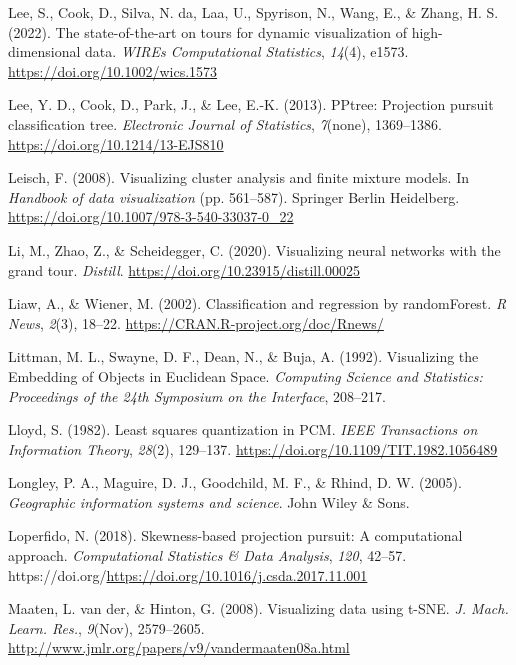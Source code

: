 \documentclass[
  letterpaper,
]{krantz}
\newlength{\cslhangindent}
\newenvironment{CSLReferences}[2] %
 {\begin{list}{}{%
  \setlength{\itemindent}{0pt}
  \setlength{\leftmargin}{0pt}
  \setlength{\parsep}{0pt}
  \ifodd #1
   \setlength{\leftmargin}{\cslhangindent}
   \setlength{\itemindent}{-1\cslhangindent}
  \fi
  \setlength{\itemsep}{#2\baselineskip}}}
 {\end{list}}
\begin{document}
\begin{CSLReferences}{1}{0}
Lee, S., Cook, D., Silva, N. da, Laa, U., Spyrison, N., Wang, E., \&
Zhang, H. S. (2022). The state-of-the-art on tours for dynamic
visualization of high-dimensional data. \emph{WIREs Computational
Statistics}, \emph{14}(4), e1573.
\url{https://doi.org/10.1002/wics.1573}

Lee, Y. D., Cook, D., Park, J., \& Lee, E.-K. (2013). {PPtree:
Projection pursuit classification tree}. \emph{Electronic Journal of
Statistics}, \emph{7}(none), 1369--1386.
\url{https://doi.org/10.1214/13-EJS810}

Leisch, F. (2008). Visualizing cluster analysis and finite mixture
models. In \emph{Handbook of data visualization} (pp. 561--587).
Springer Berlin Heidelberg.
\url{https://doi.org/10.1007/978-3-540-33037-0_22}

Li, M., Zhao, Z., \& Scheidegger, C. (2020). Visualizing neural networks
with the grand tour. \emph{Distill}.
\url{https://doi.org/10.23915/distill.00025}

Liaw, A., \& Wiener, M. (2002). Classification and regression by
randomForest. \emph{R News}, \emph{2}(3), 18--22.
\url{https://CRAN.R-project.org/doc/Rnews/}

Littman, M. L., Swayne, D. F., Dean, N., \& Buja, A. (1992). Visualizing
the {E}mbedding of {O}bjects in {E}uclidean {S}pace. \emph{Computing
Science and Statistics: Proceedings of the 24th Symposium on the
Interface}, 208--217.

Lloyd, S. (1982). Least squares quantization in PCM. \emph{IEEE
Transactions on Information Theory}, \emph{28}(2), 129--137.
\url{https://doi.org/10.1109/TIT.1982.1056489}

Longley, P. A., Maguire, D. J., Goodchild, M. F., \& Rhind, D. W.
(2005). \emph{Geographic information systems and science}. John Wiley \&
Sons.

Loperfido, N. (2018). Skewness-based projection pursuit: A computational
approach. \emph{Computational Statistics \& Data Analysis}, \emph{120},
42--57. https://doi.org/\url{https://doi.org/10.1016/j.csda.2017.11.001}

Maaten, L. van der, \& Hinton, G. (2008). Visualizing data using
{t-SNE}. \emph{J. Mach. Learn. Res.}, \emph{9}(Nov), 2579--2605.
\url{http://www.jmlr.org/papers/v9/vandermaaten08a.html}


\end{CSLReferences}
\end{document}
